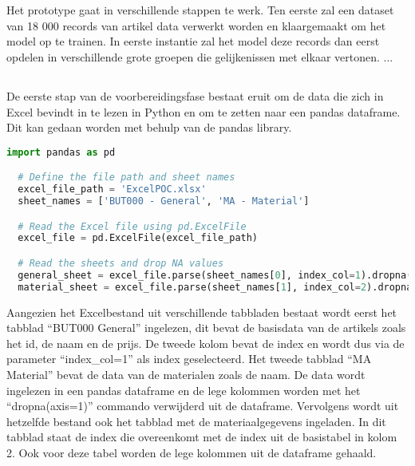 
\chapter{}%
\label{ch:ProofOfConcept}
Het prototype gaat in verschillende stappen te werk. Ten eerste zal een dataset van 18 000 records van artikel data verwerkt worden en klaargemaakt om het model op te trainen. In eerste instantie zal het model deze records dan eerst opdelen in verschillende grote groepen die gelijkenissen met elkaar vertonen. ...

\section{}%
\label{sec:voorbereiding}

De eerste stap van de voorbereidingsfase bestaat eruit om de data die zich in Excel bevindt in te lezen in Python en om te zetten naar een pandas dataframe. Dit kan gedaan worden met behulp van de pandas library.

\begin{lstlisting}[language=Python, caption={Het inlezen van Excel-gegevens in een pandas dataframe.}]
  import pandas as pd

  # Define the file path and sheet names
  excel_file_path = 'ExcelPOC.xlsx'
  sheet_names = ['BUT000 - General', 'MA - Material']

  # Read the Excel file using pd.ExcelFile
  excel_file = pd.ExcelFile(excel_file_path)

  # Read the sheets and drop NA values
  general_sheet = excel_file.parse(sheet_names[0], index_col=1).dropna(axis=1)
  material_sheet = excel_file.parse(sheet_names[1], index_col=2).dropna(axis=1)
\end{lstlisting}

Aangezien het Excelbestand uit verschillende tabbladen bestaat wordt eerst het tabblad ``BUT000 \textendash General'' ingelezen, dit bevat de basisdata van de artikels zoals het id, de naam en de prijs. De tweede kolom bevat de index en wordt dus via de parameter ``index\_col=1'' als index geselecteerd. Het tweede tabblad ``MA \textendash Material'' bevat de data van de materialen zoals de naam. De data wordt ingelezen in een pandas dataframe en de lege kolommen worden met het ``dropna(axis=1)'' commando verwijderd uit de dataframe.
Vervolgens wordt uit hetzelfde bestand ook het tabblad met de materiaalgegevens ingeladen. In dit tabblad staat de index die overeenkomt met de index uit de basistabel in kolom 2. Ook voor deze tabel worden de lege kolommen uit de dataframe gehaald.

